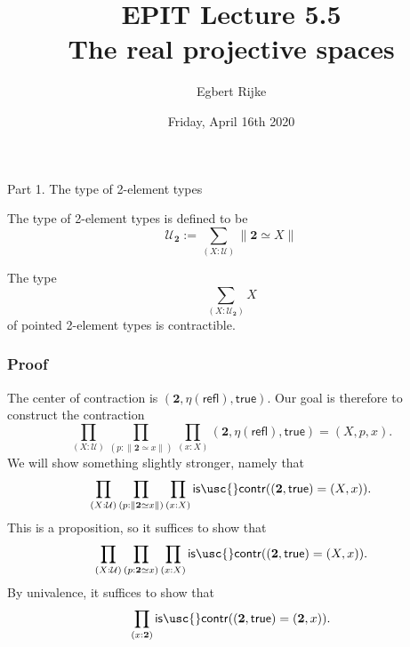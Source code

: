\documentclass[handout]{beamer}
\title{EPIT Lecture 5.5\\ The real projective spaces}
\author{Egbert Rijke}
\date{Friday, April 16th 2020}
\newcommand{\UU}{\mathcal{U}}
\newcommand{\brck}[1]{\|#1\|}
\newcommand{\refl}{\mathsf{refl}}
\newcommand{\bool}{\mathbf{2}}
\newcommand{\btrue}{\mathsf{true}}
\newcommand{\iscontr}{\mathsf{is\usc{}contr}}
\begin{document}
\begin{frame}
  \maketitle
\end{frame}

\begin{frame}
  \huge{Part 1. The type of 2-element types}
\end{frame}

\begin{frame}
  \begin{definition}
    The type of 2-element types is defined to be
    \begin{equation*}
      \UU_\bool :=\sum_{(X:\UU)}\brck{\bool\simeq X}
    \end{equation*}
  \end{definition}

  \begin{theorem}
    The type
    \begin{equation*}
      \sum_{(X:\UU_\bool)}X
    \end{equation*}
    of pointed 2-element types is contractible.
  \end{theorem}
\end{frame}

\begin{frame}
  \frametitle{Proof}
  The center of contraction is $(\bool,\eta(\refl),\btrue)$. Our goal is therefore to construct the contraction
  \begin{equation*}
    \prod_{(X:\UU)}\prod_{(p:\brck{\bool\simeq x})}\prod_{(x:X)}(\bool,\eta(\refl),\btrue)=(X,p,x).
  \end{equation*}
  We will show something slightly stronger, namely that
  \begin{equation*}
    \prod_{(X:\UU)}\prod_{(p:\brck{\bool\simeq x})}\prod_{(x:X)}\iscontr((\bool,\btrue)=(X,x)).
  \end{equation*}
  This is a proposition, so it suffices to show that
    \begin{equation*}
    \prod_{(X:\UU)}\prod_{(p:\bool\simeq x)}\prod_{(x:X)}\iscontr((\bool,\btrue)=(X,x)).
  \end{equation*}
  By univalence, it suffices to show that
  \begin{equation*}
    \prod_{(x:\bool)}\iscontr((\bool,\btrue)=(\bool,x)).
  \end{equation*}
\end{frame}
\end{document}
